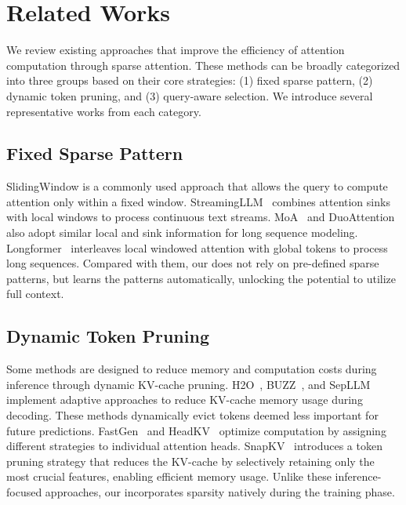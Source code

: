 \section{Related Works}
\label{app:related}


We review existing approaches that improve the efficiency of attention computation through sparse attention. These methods can be broadly categorized into three groups based on their core strategies: (1) fixed sparse pattern, (2) dynamic token pruning, and (3) query-aware selection. We introduce several representative works from each category.

\subsection{Fixed Sparse Pattern}
SlidingWindow is a commonly used approach that allows the query to compute attention only within a fixed window. 
StreamingLLM~\citep{streaming} combines attention sinks with local windows to process continuous text streams. 
MoA~\citep{moa} and DuoAttention~\citep{xiao2024duoattention} also adopt similar local and sink information for long sequence modeling.
Longformer~\citep{beltagy2020longformer} interleaves local windowed attention with global tokens to process long sequences.
Compared with them, our \method{} does not rely on pre-defined sparse patterns, but learns the patterns automatically, unlocking the potential to utilize full context. 

\subsection{Dynamic Token Pruning}
Some methods are designed to reduce memory and computation costs during inference through dynamic KV-cache pruning.
H2O~\citep{h2o}, BUZZ~\citep{zhao2024buzz}, and SepLLM~\citep{chen2024sepllm} implement adaptive approaches to reduce KV-cache memory usage during decoding. These methods dynamically evict tokens deemed less important for future predictions.
FastGen~\cite{ge2023model} and HeadKV~\citep{fu2024not} optimize computation by assigning different strategies to individual attention heads.
SnapKV~\citep{snapkv} introduces a token pruning strategy that reduces the KV-cache by selectively retaining only the most crucial features, enabling efficient memory usage. 
Unlike these inference-focused approaches, our \method{} incorporates sparsity natively during the training phase.



